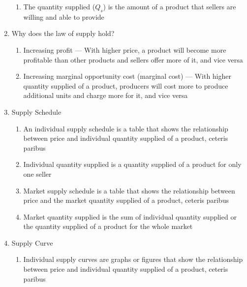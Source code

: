 \documentclass[12pt]{article}
\begin{document}
\begin{enumerate}
\begin{enumerate}
          \item The quantity supplied ($Q_s$) is the amount of a product that sellers are willing and able to provide

        \end{enumerate}

      \item Why does the law of supply hold?

        \begin{enumerate}

          \item Increasing profit — With higher price, a product will become more profitable than other products and sellers offer more of it, and vice versa

          \item Increasing marginal opportunity cost (marginal cost) — With higher quantity supplied of a product, producers will cost more to produce additional units and charge more for it, and vice versa

        \end{enumerate}

      \item Supply Schedule

        \begin{enumerate}

          \item An individual supply schedule is a table that shows the relationship between price and individual quantity supplied of a product, ceteris paribus

          \item Individual quantity supplied is a quantity supplied of a product for only one seller

          \item Market supply schedule is a table that shows the relationship between price and the market quantity supplied of a product, ceteris paribus

          \item Market quantity supplied is the sum of individual quantity supplied or the quantity supplied of a product for the whole market

        \end{enumerate}

      \item Supply Curve

        \begin{enumerate}

          \item Individual supply curves are graphs or figures that show the relationship between price and individual quantity supplied of a product, ceteris paribus


\end{enumerate}
\end{enumerate}
\end{document}
